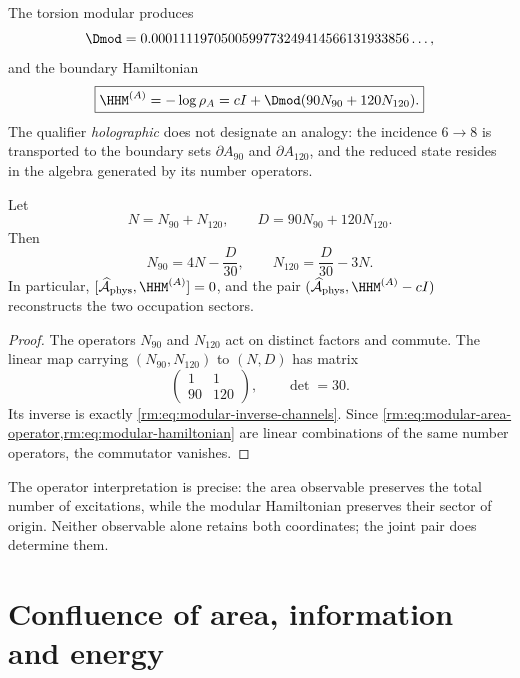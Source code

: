 The torsion modular produces
\begin{equation}
\label{rm:eq:modular-delta-value}
\Dmod
=0.0001111970500599773249414566131933856\ldots,
\end{equation}
and the boundary Hamiltonian
\begin{equation}
\label{rm:eq:modular-hamiltonian}
\boxed{
\HHM^{(A)}=-\log\rho_A
=cI+\Dmod(90N_{90}+120N_{120}).}
\end{equation}
The qualifier \emph{holographic} does not designate an analogy: the
incidence \(6\to8\) is transported to the boundary sets
\(\partial A_{90}\) and \(\partial A_{120}\), and the reduced state resides
in the algebra generated by its number operators.

\begin{theorem}
\label{rm:thm:modular-area-memory}
Let
\begin{equation}
\label{rm:eq:modular-ND}
N=N_{90}+N_{120},
\qquad
D=90N_{90}+120N_{120}.
\end{equation}
Then
\begin{equation}
\label{rm:eq:modular-inverse-channels}
\boxed{
N_{90}=4N-\frac{D}{30},
\qquad
N_{120}=\frac{D}{30}-3N.}
\end{equation}
In particular,
\([\widehat{\mathcal A}_{\rm phys},\HHM^{(A)}]=0\), and the pair
\((\widehat{\mathcal A}_{\rm phys},\HHM^{(A)}-cI)\) reconstructs the two
occupation sectors.
\end{theorem}

\begin{proof}
The operators \(N_{90}\) and \(N_{120}\) act on distinct factors
and commute. The linear map carrying \((N_{90},N_{120})\) to \((N,D)\)
has matrix
\[
\begin{pmatrix}1&1\\90&120\end{pmatrix},
\qquad \det=30.
\]
Its inverse is exactly \cref{rm:eq:modular-inverse-channels}. Since
\cref{rm:eq:modular-area-operator,rm:eq:modular-hamiltonian} are linear
combinations of the same number operators, the commutator vanishes.
\end{proof}

The operator interpretation is precise: the area observable preserves the total number of excitations, while the modular Hamiltonian preserves their sector of origin. Neither observable alone retains both coordinates; the joint pair does determine them.

\section{Confluence of area, information and energy}

